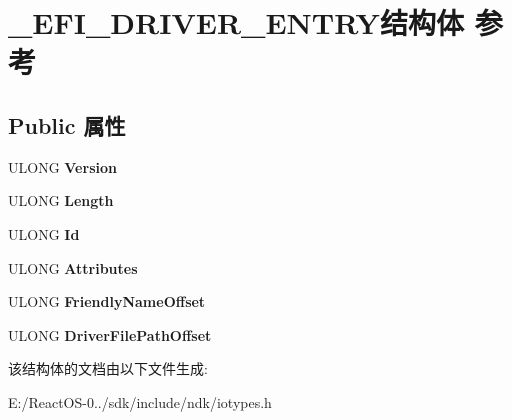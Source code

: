 \hypertarget{struct___e_f_i___d_r_i_v_e_r___e_n_t_r_y}{}\section{\+\_\+\+E\+F\+I\+\_\+\+D\+R\+I\+V\+E\+R\+\_\+\+E\+N\+T\+R\+Y结构体 参考}
\label{struct___e_f_i___d_r_i_v_e_r___e_n_t_r_y}
\subsection*{Public 属性}
\begin{DoxyCompactItemize}
\item 
\mbox{\label{struct___e_f_i___d_r_i_v_e_r___e_n_t_r_y_a6784f75280b8d61ec1d12b675b36247c}} 
U\+L\+O\+NG {\bfseries Version}
\item 
\mbox{\label{struct___e_f_i___d_r_i_v_e_r___e_n_t_r_y_aeb06a8ee86f4c9a8f52262fbfb297c0f}} 
U\+L\+O\+NG {\bfseries Length}
\item 
\mbox{\label{struct___e_f_i___d_r_i_v_e_r___e_n_t_r_y_a3a8f86fa145a8db4b6955388f2708eed}} 
U\+L\+O\+NG {\bfseries Id}
\item 
\mbox{\label{struct___e_f_i___d_r_i_v_e_r___e_n_t_r_y_ab4a150a98d0317d993c94ede00c858a2}} 
U\+L\+O\+NG {\bfseries Attributes}
\item 
\mbox{\label{struct___e_f_i___d_r_i_v_e_r___e_n_t_r_y_aa8cdf73485fab031291fdb54f6cc0b5e}} 
U\+L\+O\+NG {\bfseries Friendly\+Name\+Offset}
\item 
\mbox{\label{struct___e_f_i___d_r_i_v_e_r___e_n_t_r_y_a061aef55ad9df8632f7719224e94d501}} 
U\+L\+O\+NG {\bfseries Driver\+File\+Path\+Offset}
\end{DoxyCompactItemize}


该结构体的文档由以下文件生成\+:\begin{DoxyCompactItemize}
\item 
E\+:/\+React\+O\+S-\/0../sdk/include/ndk/iotypes.\+h\end{DoxyCompactItemize}
